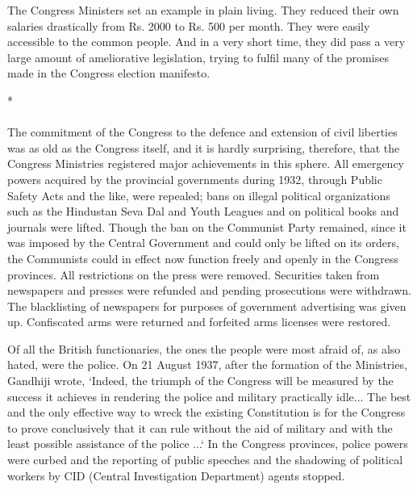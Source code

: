 The Congress Ministers set an example in plain living. They reduced their own salaries drastically from Rs. 2000 to Rs. 500 per month. They were easily accessible to the common people. And in a very short time, they did pass a very large amount of ameliorative legislation, trying to fulfil many of the promises made in the Congress election manifesto.

\begin{center}*\end{center}

\paragraph*{}


The commitment of the Congress to the defence and extension of civil liberties was as old as the Congress itself, and it is hardly surprising, therefore, that the Congress Ministries registered major achievements in this sphere. All emergency powers acquired by the provincial governments during 1932, through Public Safety Acts and the like, were repealed; bans on illegal political organizations such as the Hindustan Seva Dal and Youth Leagues and on political books and journals were lifted. Though the ban on the Communist Party remained, since it was imposed by the Central Government and could only be lifted on its orders, the Communists could in effect now function freely and openly in the Congress provinces. All restrictions on the press were removed. Securities taken from newspapers and presses were refunded and pending prosecutions were withdrawn. The blacklisting of newspapers for purposes of government advertising was given up. Confiscated arms were returned and forfeited arms licenses were restored. 

Of all the British functionaries, the ones the people were most afraid of, as also hated, were the police. On 21 August 1937, after the formation of the Ministries, Gandhiji wrote, `Indeed, the triumph of the Congress will be measured by the success it achieves in rendering the police and military practically idle... The best and the only effective way to wreck the existing Constitution is for the Congress to prove conclusively that it can rule without the aid of military and with the least possible assistance of the police ...` In the Congress provinces, police powers were curbed and the reporting of public speeches and the shadowing of political workers by CID (Central Investigation Department) agents stopped. 

